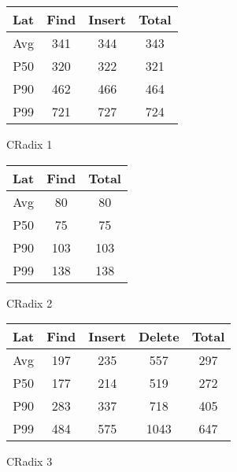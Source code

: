\documentclass[]{article}
\begin{document}
\begin{figure}[H]
    \centering
    \begin{minipage}{0.33\textwidth}
        \centering
            \begin{tabular}{|c|ccc|}
            \hline
                Lat &  Find  & Insert & Total  \\ \hline
                Avg & 341  & 344  & 343   \\ 
                P50 & 320  & 322  & 321   \\ 
                P90 & 462  & 466  & 464   \\ 
                P99 & 721  & 727  & 724   \\ \hline
            \end{tabular}
        \caption{CRadix 1}
    \end{minipage}
    \begin{minipage}{0.26\textwidth}
        \centering
            \begin{tabular}{|c|cc|}
            \hline
                Lat &  Find  &  Total  \\ \hline
                Avg & 80 & 80  \\ 
                P50 & 75 & 75  \\ 
                P90 & 103 & 103  \\ 
                P99 & 138 & 138  \\ \hline
            \end{tabular}
        \caption{CRadix 2}
    \end{minipage}
    \begin{minipage}{0.35\textwidth}
        \centering
            \begin{tabular}{|c|cccc|}
            \hline
                Lat &  Find  & Insert & Delete & Total  \\ \hline
                Avg & 197  & 235  & 557  & 297   \\ 
                P50 & 177  & 214  & 519  & 272   \\ 
                P90 & 283  & 337  & 718  & 405   \\ 
                P99 & 484  & 575  & 1043  & 647   \\ \hline
            \end{tabular}
        \caption{CRadix 3}
    \end{minipage}
\end{figure}
\end{document}

